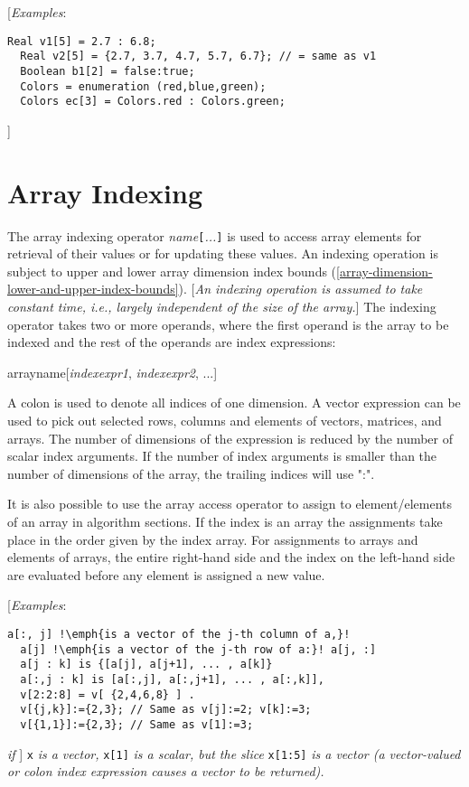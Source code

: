 {[}\emph{Examples}:

\begin{lstlisting}[language=modelica]
  Real v1[5] = 2.7 : 6.8;
  Real v2[5] = {2.7, 3.7, 4.7, 5.7, 6.7}; // = same as v1
  Boolean b1[2] = false:true;
  Colors = enumeration (red,blue,green);
  Colors ec[3] = Colors.red : Colors.green;
\end{lstlisting}
{]}

\section{Array Indexing}

The array indexing operator \emph{name}\lstinline![!\emph{...}\lstinline!]! is used to
access array elements for retrieval of their values or for updating
these values. An indexing operation is subject to upper and lower array
dimension index bounds (\autoref{array-dimension-lower-and-upper-index-bounds}). {[}\emph{An indexing operation
is assumed to take constant time, i.e., largely independent of the size
of the array.}{]} The indexing operator takes two or more operands,
where the first operand is the array to be indexed and the rest of the
operands are index expressions:

arrayname{[}\emph{indexexpr1}, \emph{indexexpr2}, ...{]}

A colon is used to denote all indices of one dimension. A vector
expression can be used to pick out selected rows, columns and elements
of vectors, matrices, and arrays. The number of dimensions of the
expression is reduced by the number of scalar index arguments. If the
number of index arguments is smaller than the number of dimensions of
the array, the trailing indices will use ":".

It is also possible to use the array access operator to assign to
element/elements of an array in algorithm sections. If the index is an
array the assignments take place in the order given by the index array.
For assignments to arrays and elements of arrays, the entire right-hand
side and the index on the left-hand side are evaluated before any
element is assigned a new value.

{[}\emph{Examples}:
\begin{lstlisting}[language=modelica, escapechar=!]
  a[:, j] !\emph{is a vector of the j-th column of a,}!
  a[j] !\emph{is a vector of the j-th row of a:}! a[j, :]
  a[j : k] is {[a[j], a[j+1], ... , a[k]}
  a[:,j : k] is [a[:,j], a[:,j+1], ... , a[:,k]],
  v[2:2:8] = v[ {2,4,6,8} ] .
  v[{j,k}]:={2,3}; // Same as v[j]:=2; v[k]:=3;
  v[{1,1}]:={2,3}; // Same as v[1]:=3;
\end{lstlisting}
\emph{if} ] \lstinline!x! \emph{is a vector,} \lstinline!x[1]! \emph{is a scalar, but the
slice} \lstinline!x[1:5]! \emph{is a vector (a vector-valued or colon index
expression causes a vector to be returned).}

